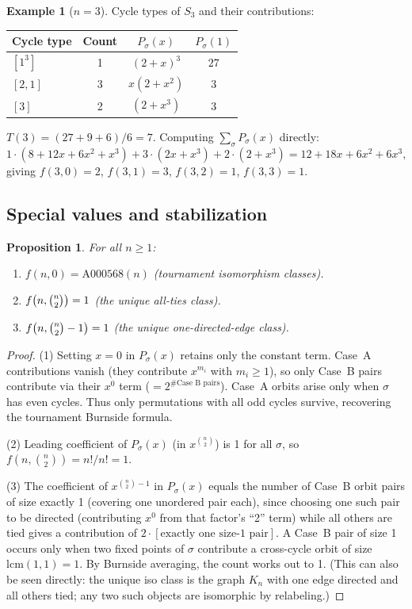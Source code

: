 \documentclass[12pt,reqno]{amsart}
\newtheorem{proposition}[theorem]{Proposition}
\theoremstyle{definition}
\newtheorem{example}[theorem]{Example}
\theoremstyle{plain}
\newcommand{\lcm}{\mathrm{lcm}}
\begin{document}
\begin{example}[$n=3$]\label{ex:n3}
Cycle types of $S_3$ and their contributions:
\begin{center}
\begin{tabular}{lccc}
\toprule
Cycle type & Count & $P_\sigma(x)$ & $P_\sigma(1)$ \\
\midrule
$[1^3]$ & 1 & $(2+x)^3$ & $27$ \\
$[2,1]$ & 3 & $x(2+x^2)$ & $3$ \\
$[3]$   & 2 & $(2+x^3)$ & $3$ \\
\bottomrule
\end{tabular}
\end{center}
$T(3)=(27+9+6)/6=7$. Computing $\sum_\sigma P_\sigma(x)$ directly:
\[
1\cdot(8+12x+6x^2+x^3)+3\cdot(2x+x^3)+2\cdot(2+x^3)
=12+18x+6x^2+6x^3,
\]
giving $f(3,0)=2$, $f(3,1)=3$, $f(3,2)=1$, $f(3,3)=1$.
\end{example}

\subsection{Special values and stabilization}

\begin{proposition}\label{prop:boundary-f}
For all $n\ge 1$:
\begin{enumerate}
\item $f(n,0)=\mathrm{A000568}(n)$ (tournament isomorphism classes).
\item $f\!\left(n,\tbinom{n}{2}\right)=1$ (the unique all-ties class).
\item $f\!\left(n,\tbinom{n}{2}-1\right)=1$ (the unique one-directed-edge class).
\end{enumerate}
\end{proposition}

\begin{proof}
(1) Setting $x=0$ in $P_\sigma(x)$ retains only the constant term.
Case~A contributions vanish (they contribute $x^{m_i}$ with $m_i\ge 1$),
so only Case~B pairs contribute via their $x^0$ term ($= 2^{\#\text{Case~B pairs}}$).
Case~A orbits arise only when $\sigma$ has even cycles.  Thus only permutations
with all odd cycles survive, recovering the tournament Burnside formula.

(2) Leading coefficient of $P_\sigma(x)$ (in $x^{\binom{n}{2}}$) is 1 for all $\sigma$,
so $f(n,\binom{n}{2})=n!/n!=1$.

(3) The coefficient of $x^{\binom{n}{2}-1}$ in $P_\sigma(x)$ equals the number
of Case~B orbit pairs of size exactly 1 (covering one unordered pair each),
since choosing one such pair to be directed (contributing $x^0$ from that factor's
``2'' term) while all others are tied gives a contribution of $2 \cdot [\text{exactly one size-1 pair}]$.
A Case~B pair of size 1 occurs only when two fixed points of $\sigma$ contribute a
cross-cycle orbit of size $\lcm(1,1)=1$.  By Burnside averaging, the count works out
to 1.  (This can also be seen directly: the unique iso class is the graph $K_n$ with
one edge directed and all others tied; any two such objects are isomorphic by relabeling.)
\end{proof}
\end{document}
